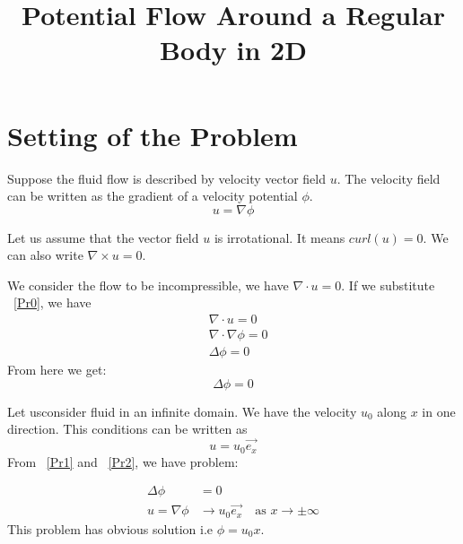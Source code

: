\documentclass[a4paper,12pt]{article}
\title{Potential Flow Around a Regular Body in 2D}
\author{}
\date{}
\begin{document}
\maketitle
\section{Setting of the Problem}

Suppose the fluid flow is described by velocity vector field $u$. The velocity field can be written as the gradient 
of a velocity potential $\phi$. 
\begin{equation}\label{Pr0}
 u=\nabla \phi
\end{equation}

Let us assume that the vector field $u$ is irrotational. It means 
$curl(u)=0$. We can also write
$\nabla\times u=0$.

We consider the flow to be incompressible, we have $\nabla\cdot u=0$. If we substitute ~\eqref{Pr0}, we have
\begin{align}
&\nabla \cdot u=0 \\
 &\nabla \cdot \nabla\phi=0 \\
 &\Delta \phi=0
\end{align}
From here we get:
\begin{equation} \label{Pr1}
 \Delta \phi=0
\end{equation}

Let usconsider fluid in an infinite domain. We have the velocity $u_0$ along $x$ in one direction.  This conditions can be written as
\begin{equation} \label{Pr2}
u=u_0\vec{e_x}
\end{equation}
From ~\eqref{Pr1} and ~\eqref{Pr2}, we have problem:


\begin{align} \label{problem1}
\Delta \phi &=0\\
u=\nabla \phi &\to u_0 \vec{e_x} \quad \text{as } x\to\pm\infty
\end{align}
This problem has obvious solution i.e $\phi= u_0 x$.
\end{document}
